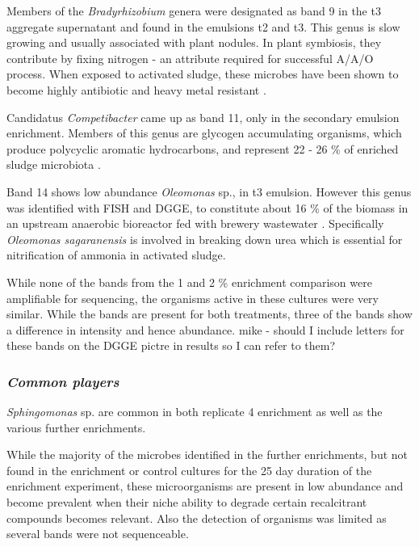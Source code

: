 \documentclass[11pt]{article}
\begin{document}
Members of the \emph{Bradyrhizobium} genera were designated as band 9 in the t3 aggregate supernatant and found in the emulsions t2 and t3. This genus is slow growing \cite{rebah2002wastewater} and usually associated with plant nodules. In plant symbiosis, they contribute by fixing nitrogen - an attribute required for successful A/A/O process. When exposed to activated sludge, these microbes have been shown to become highly antibiotic and heavy metal resistant \cite{ahmad17samiullah}.


Candidatus \emph{Competibacter} came up as band 11, only in the secondary emulsion enrichment. Members of this genus are glycogen accumulating organisms, which produce polycyclic aromatic hydrocarbons, and represent 22 - 26 \% of enriched sludge microbiota \cite{bengtsson2008production,lemaire2008microbial}. 


Band 14 shows low abundance \emph{Oleomonas} sp., in t3 emulsion. However this genus was identified with FISH and DGGE, to constitute about 16 \% of the biomass in an upstream anaerobic bioreactor fed with brewery wastewater \cite{fernandez2008analysis}. Specifically \emph{Oleomonas sagaranensis} is involved in breaking down urea \cite{kanamori2005allophanate,kanamori2004enzymatic} which is essential for nitrification of ammonia in activated sludge.


While none of the bands from the 1 and 2 \% enrichment comparison were amplifiable for sequencing, the organisms active in these cultures were very similar. While the bands are present for both treatments, three of the bands show a difference in intensity and hence abundance.
mike - should I include letters for these bands on the DGGE pictre in results so I can refer to them?

\subsubsection{\emph{Common players}}
\emph{Sphingomonas} sp. are common in both replicate 4 enrichment as well as the various further enrichments.


While the majority of the microbes identified in the further enrichments, but not found in the enrichment or control cultures for the 25 day duration of the enrichment experiment, these microorganisms are present in low abundance and become prevalent when their niche ability to degrade certain recalcitrant compounds becomes relevant. Also the detection of organisms was limited as several bands were not sequenceable.
\end{document}
